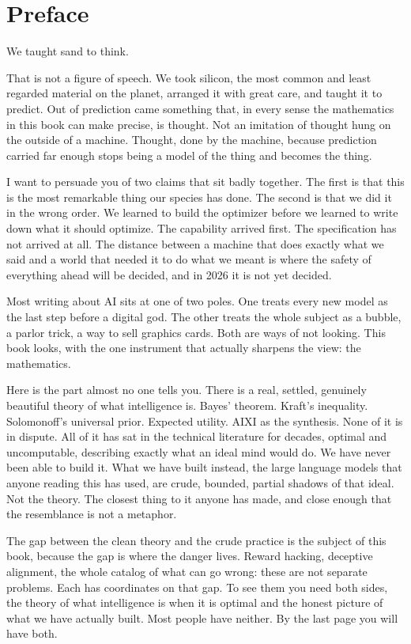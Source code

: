 \chapter*{Preface}

We taught sand to think.

That is not a figure of speech. We took silicon, the most common and least regarded material on the planet, arranged it with great care, and taught it to predict. Out of prediction came something that, in every sense the mathematics in this book can make precise, is thought. Not an imitation of thought hung on the outside of a machine. Thought, done by the machine, because prediction carried far enough stops being a model of the thing and becomes the thing.

I want to persuade you of two claims that sit badly together. The first is that this is the most remarkable thing our species has done. The second is that we did it in the wrong order. We learned to build the optimizer before we learned to write down what it should optimize. The capability arrived first. The specification has not arrived at all. The distance between a machine that does exactly what we said and a world that needed it to do what we meant is where the safety of everything ahead will be decided, and in 2026 it is not yet decided.

Most writing about AI sits at one of two poles. One treats every new model as the last step before a digital god. The other treats the whole subject as a bubble, a parlor trick, a way to sell graphics cards. Both are ways of not looking. This book looks, with the one instrument that actually sharpens the view: the mathematics.

Here is the part almost no one tells you. There is a real, settled, genuinely beautiful theory of what intelligence is. Bayes' theorem. Kraft's inequality. Solomonoff's universal prior. Expected utility. AIXI as the synthesis. None of it is in dispute. All of it has sat in the technical literature for decades, optimal and uncomputable, describing exactly what an ideal mind would do. We have never been able to build it. What we have built instead, the large language models that anyone reading this has used, are crude, bounded, partial shadows of that ideal. Not the theory. The closest thing to it anyone has made, and close enough that the resemblance is not a metaphor.

The gap between the clean theory and the crude practice is the subject of this book, because the gap is where the danger lives. Reward hacking, deceptive alignment, the whole catalog of what can go wrong: these are not separate problems. Each has coordinates on that gap. To see them you need both sides, the theory of what intelligence is when it is optimal and the honest picture of what we have actually built. Most people have neither. By the last page you will have both.

